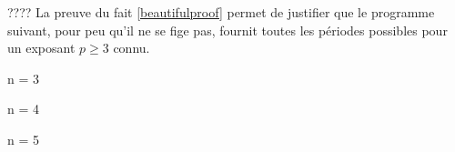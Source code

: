 
{\Huge ????} La preuve du fait \ref{beautifulproof} permet de justifier que le programme suivant, pour peu qu'il ne se fige pas, fournit toutes les périodes possibles pour un exposant $p \geqslant 3$ connu.


n = 3
\begin{rawcode}
[0]
[1]
[55, 250, 133]
[136, 244]
[153]
[160, 217, 352]
[370]
[371]
[407]
[919, 1459]
\end{rawcode}


n = 4
\begin{rawcode}
[0]
[1]
[1138, 4179, 9219, 13139, 6725, 4338, 4514]
[1634]
[2178, 6514]
[8208]
[9474]
\end{rawcode}


n = 5
\begin{rawcode}

\end{rawcode}

